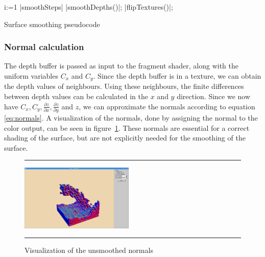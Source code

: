 
\begin{algorithm}
	\begin{program}
	\caption
	\FOR i:=1 \TO |smoothSteps| \DO
		|smoothDepths()|;
		|flipTextures()|;
	\end{program}
	\label{program:smooth}
	\caption{Surface smoothing pseudocode}
\end{algorithm}

\subsubsection{Normal calculation}
The depth buffer is passed as input to the fragment shader, along with the uniform variables $C_x$ and $C_y$.
Since the depth buffer is in a texture, we can obtain the depth values of neighbours.
Using these neighbours, the finite differences between depth values can be calculated in the $x$ and $y$ direction.
Since we now have $C_x, C_y, \frac{\partial z}{\partial x}, \frac{\partial z}{\partial y}$ and $z$, we can approximate the normals according to equation \ref{eq:normals}.
A visualization of the normals, done by assigning the normal to the color output, can be seen in figure~\ref{fig:normals}. 
These normals are essential for a correct shading of the surface, but are not explicitly needed for the smoothing of the surface.

\begin{figure}[!th]
\hrule
\begin{center}
\vspace*{2ex}\includegraphics[width=0.48\textwidth,clip=true,trim=10cm 1cm 10cm 3cm]{pictures/normal_normal.png}
\end{center}
\caption{Visualization of the unsmoothed normals}
\label{fig:normals} 
\vspace*{2ex}
\hrule
\end{figure}

